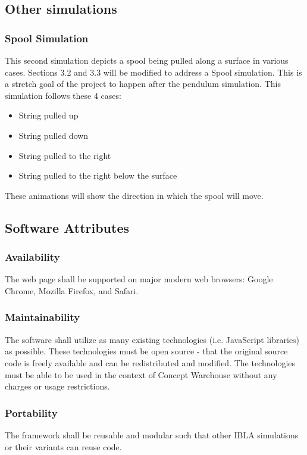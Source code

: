 \subsection{Other simulations}
\subsubsection{Spool Simulation}
This second simulation depicts a spool being pulled along a surface in various cases. Sections 3.2 and 3.3 will be modified to address a Spool simulation. This is a stretch goal of the project to happen after the pendulum simulation. This simulation follows these 4 cases:
\begin{itemize}
    \item String pulled up
    \item String pulled down
    \item String pulled to the right
    \item String pulled to the right below the surface
\end{itemize}
These animations will show the direction in which the spool will move. 

\subsection{Software Attributes}
\subsubsection{Availability}
The web page shall be supported on major modern web browsers: Google Chrome, Mozilla Firefox, and Safari.
\subsubsection{Maintainability}
The software shall utilize as many existing technologies (i.e. JavaScript libraries) as possible. These technologies must be open source - that the original source code is freely available and can be redistributed and modified. The technologies must be able to be used in the context of Concept Warehouse without any charges or usage restrictions.
\subsubsection{Portability}
The framework shall be reusable and modular such that other IBLA simulations or their variants can reuse code.

